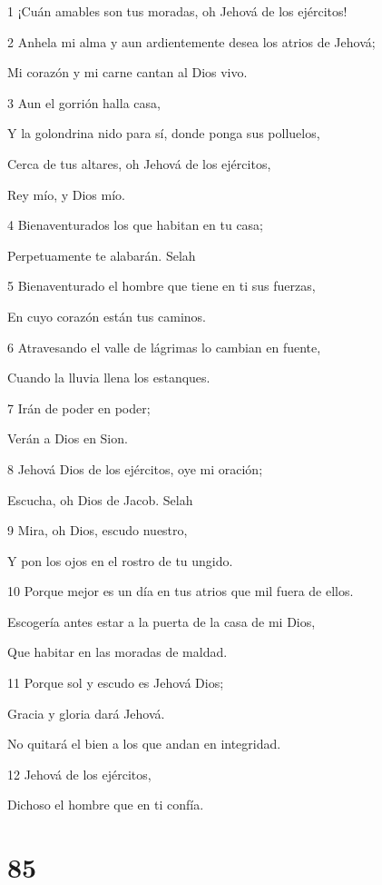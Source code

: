 \par 1 ¡Cuán amables son tus moradas, oh Jehová de los ejércitos!
\par 2 Anhela mi alma y aun ardientemente desea los atrios de Jehová;
\par Mi corazón y mi carne cantan al Dios vivo.
\par 3 Aun el gorrión halla casa,
\par Y la golondrina nido para sí, donde ponga sus polluelos,
\par Cerca de tus altares, oh Jehová de los ejércitos,
\par Rey mío, y Dios mío.
\par 4 Bienaventurados los que habitan en tu casa;
\par Perpetuamente te alabarán. Selah
\par 5 Bienaventurado el hombre que tiene en ti sus fuerzas,
\par En cuyo corazón están tus caminos.
\par 6 Atravesando el valle de lágrimas lo cambian en fuente,
\par Cuando la lluvia llena los estanques.
\par 7 Irán de poder en poder;
\par Verán a Dios en Sion.
\par 8 Jehová Dios de los ejércitos, oye mi oración;
\par Escucha, oh Dios de Jacob. Selah
\par 9 Mira, oh Dios, escudo nuestro,
\par Y pon los ojos en el rostro de tu ungido.
\par 10 Porque mejor es un día en tus atrios que mil fuera de ellos.
\par Escogería antes estar a la puerta de la casa de mi Dios,
\par Que habitar en las moradas de maldad.
\par 11 Porque sol y escudo es Jehová Dios;
\par Gracia y gloria dará Jehová.
\par No quitará el bien a los que andan en integridad.
\par 12 Jehová de los ejércitos,
\par Dichoso el hombre que en ti confía.

\chapter{85}

